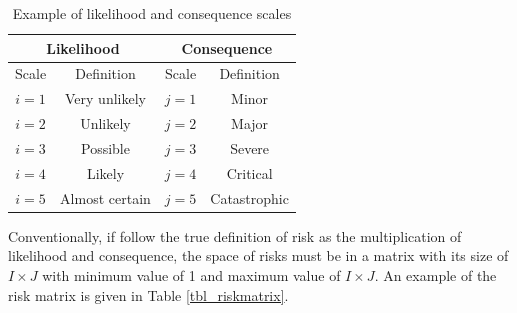 \documentclass[10pt,halfline,a4paper]{ouparticle}
\begin{document}
\begin{table}
\centering
\caption{Example of likelihood and consequence scales} 
\begin{tabular}{l|l|l|l}
\hline
\multicolumn{2}{c|}{Likelihood} & \multicolumn{2}{c}{Consequence} \\ 
\hline
\multicolumn{1}{c|}{Scale} & \multicolumn{1}{c|}{Definition} & \multicolumn{1}{c|}{Scale} & \multicolumn{1}{c}{Definition} \\ 
\hline
\multicolumn{1}{c|}{$i=1$} & \multicolumn{1}{c|}{Very unlikely} & \multicolumn{1}{c|}{$j=1$} & \multicolumn{1}{c}{Minor} \\ 
\multicolumn{1}{c|}{$i=2$} & \multicolumn{1}{c|}{Unlikely} & \multicolumn{1}{c|}{$j=2$} & \multicolumn{1}{c}{Major} \\ 
\multicolumn{1}{c|}{$i=3$} & \multicolumn{1}{c|}{Possible} & \multicolumn{1}{c|}{$j=3$} & \multicolumn{1}{c}{Severe} \\ 
\multicolumn{1}{c|}{$i=4$} & \multicolumn{1}{c|}{Likely} & \multicolumn{1}{c|}{$j=4$} & \multicolumn{1}{c}{Critical} \\ 
\multicolumn{1}{c|}{$i=5$} & \multicolumn{1}{c|}{Almost certain} & \multicolumn{1}{c|}{$j=5$} & \multicolumn{1}{c}{Catastrophic} \\ 
\hline
\end{tabular}
\label{tbl_likeconse}
\end{table}

Conventionally, if follow the true definition of risk as the multiplication of likelihood and consequence, the space of risks must be in a matrix with its size of $I\times J$ with minimum value of 1 and maximum value of $I\times J$. An example of the risk matrix is given in Table \ref{tbl_riskmatrix}.
\end{document}
